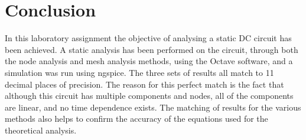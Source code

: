 \section{Conclusion}
\label{sec:conclusion}

In this laboratory assignment the objective of analysing a static DC circuit has been
achieved. A static analysis has been performed on the circuit, through both the
node analysis and mesh analysis methods, using the Octave software, and a simulation
was run using ngspice.
The three sets of results all match to 11 decimal places of precision.
The reason for this perfect match is the fact that although this circuit has multiple
components and nodes, all of the components are linear, and no time dependence exists.
The matching of results for the various methods also helps to confirm the accuracy of the equations
used for the theoretical analysis.

\lipsum[1-1]
